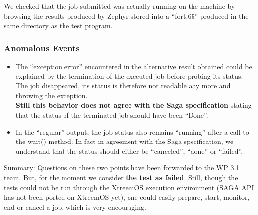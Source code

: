 We checked that the job submitted was actually running on the 
machine by browsing the results produced by Zephyr stored
into a ``fort.66'' produced in the same directory as the
test program.



\subsubsection{Anomalous Events}

\begin{itemize}
 \item The ``exception error'' encountered in the alternative result
       obtained could be explained by the termination of the executed job
       before probing its status. The job disappeared, its
       status is therefore not readable any more and throwing the
       exception. \\
       {\bf Still this behavior does not agree with the Saga specification}
       stating that the status of the terminated job should have been
       ``Done''.
 \item In the ``regular'' output, the job status also remains
       ``running'' after a call to the wait() method. In fact
       in agreement with the Saga specification, we understand that
       the status should either be ``canceled'', ``done'' or ``failed''.
\end{itemize}





 Summary: Questions on these two points have been forwarded to the WP
3.1 team. But, for the moment we consider {\bf the test as
failed}. Still, though the tests could not be run through the XtreemOS
execution environment (SAGA API has not been ported on XtreemOS yet),
one could easily prepare, start, monitor, end or cancel a job, which
is very encouraging.  

